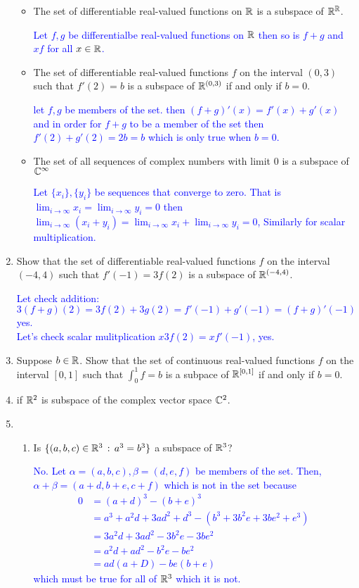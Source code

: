 \documentclass[10pt,a4paper]{report}
\newcommand{\BLUE}[1]{\textcolor{blue}{#1}}
\begin{document}
\begin{enumerate}
\begin{itemize}
	\item The set of differentiable real-valued functions on $\mathbb{R}$ is a subspace of $\mathbb{R}^{\mathbb{R}}$.
	
	\BLUE{Let $f,g$ be differentialbe real-valued functions on $\mathbb{R}$ then so is $f+g$ and $xf$ for all $x\in \mathbb{R}$.
	}
	
	\item The set of differentiable real-valued functions $f$ on the interval $(0,3)$ such that $f'(2)=b$ is a subspace of $\mathbb{R}^{(0,3)}$ if and only if $b=0$.
	
	\BLUE{let $f,g$ be members of the set.  then $(f+g)'(x) = f'(x)+g'(x)$ and in order for $f+g$ to be a member of the set then $f'(2)+g'(2) = 2b = b$ which is only true when $b=0$.
	}
	
	\item The set of all sequences of complex numbers with limit 0 is a subspace of $\mathbb{C}^\infty$
	
	\BLUE{Let $\{x_i\}, \{y_i\}$ be sequences that converge to zero.  That is $\lim_{i\to \infty} x_i = \lim_{i\to\infty} y_i = 0$  then $\lim_{i\to\infty}(x_i+y_i) = \lim_{i\to \infty} x_i + \lim_{i\to\infty} y_i = 0$,  Similarly for scalar multiplication.
	}
\end{itemize}

\item Show that the set of differentiable real-valued functions $f$ on the interval $(-4,4)$ such that $f'(-1)=3f(2)$ is a subspace of $\mathbb{R}^{(-4,4)}$.

\BLUE{Let check addition: $3(f+g)(2) = 3f(2)+3g(2)=f'(-1)+g'(-1)=(f+g)'(-1)$  yes. \\Let's check scalar mulitplication $x3f(2) = xf'(-1)$, yes.
}

\item Suppose $b\in\mathbb{R}$.  Show that the set of continuous real-valued functions $f$ on the interval $[0,1]$ such that $\int_0^1 f=b$ is a subpace of $\mathbb{R}^{[0,1]}$ if and only if $b=0$.

\item if $\mathbb{R}^2$ is subspace of the complex vector space $\mathbb{C}^2$.

\item \begin{enumerate}
	\item Is $\{(a,b,c)\in\mathbb{R}^3\,:\, a^3=b^3\}$ a subspace of $\mathbb{R}^3$?
	
	\BLUE{No.  Let $\alpha = (a,b,c), \beta=(d,e,f)$ be members of the set.  Then, $\alpha+\beta=(a+d,b+e,c+f)$ which is not in the set because
	\begin{align*}
		0 &= (a+d)^3 - (b+e)^3 \\
		&= a^3+a^2d+3ad^2+d^3-(b^3+3b^2e+3be^2+e^3) \\
		&= 3a^2d+3ad^2-3b^2e-3be^2 \\
		&= a^2d+ad^2-b^2e-be^2 \\
		&= ad(a+D)-be(b+e)
	\end{align*}which must be true for all of $\mathbb{R}^3$ which it is not.
	}
	

\end{enumerate}
\end{enumerate}
\end{document}
